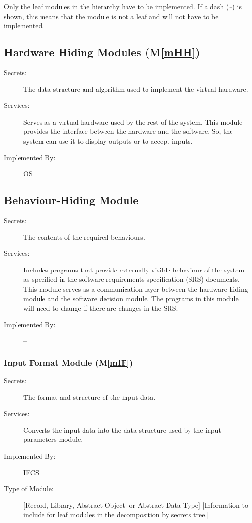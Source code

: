 \documentclass[12pt, titlepage]{article}
\newcommand{\mref}[1]{M\ref{#1}}
\begin{document}
Only the leaf modules in the hierarchy have to be implemented. If a dash
(\emph{--}) is shown, this means that the module is not a leaf and will not have
to be implemented.

\subsection{Hardware Hiding Modules (\mref{mHH})}

\begin{description}
\item[Secrets:]The data structure and algorithm used to implement the virtual
  hardware.
\item[Services:]Serves as a virtual hardware used by the rest of the
  system. This module provides the interface between the hardware and the
  software. So, the system can use it to display outputs or to accept inputs.
\item[Implemented By:] OS
\end{description}

\subsection{Behaviour-Hiding Module}

\begin{description}
\item[Secrets:]The contents of the required behaviours.
\item[Services:]Includes programs that provide externally visible behaviour of
  the system as specified in the software requirements specification (SRS)
  documents. This module serves as a communication layer between the
  hardware-hiding module and the software decision module. The programs in this
  module will need to change if there are changes in the SRS.
\item[Implemented By:] --
\end{description}

\subsubsection{Input Format Module (\mref{mIF})}

\begin{description}
\item[Secrets:]The format and structure of the input data.
\item[Services:]Converts the input data into the data structure used by the
  input parameters module.
\item[Implemented By:] IFCS
\item[Type of Module:] [Record, Library, Abstract Object, or Abstract Data Type]
  [Information to include for leaf modules in the decomposition by secrets tree.]
\end{description}
\end{document}
